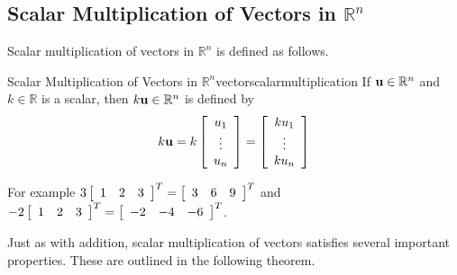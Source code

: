 \subsection{Scalar Multiplication of Vectors in \texorpdfstring{$\mathbb{R}^n$}{Rn}}

Scalar multiplication of vectors in $\mathbb{R}^n$ is defined as 
follows.

\begin{definition}{Scalar Multiplication of Vectors in $\mathbb{R}^n$}{vectorscalarmultiplication}
If ${\bf u}\in \mathbb{R}^{n}$ and $k\in \mathbb{R}$ is a
scalar, then $k{\bf u}\in \mathbb{R}^{n}$ is defined by
\begin{equation*}
k{\bf u}=k\left[ \begin{array}{c}
u_{1} \\
\vdots \\
u_{n}
\end{array}
\right] = \left[ \begin{array}{c}
ku_{1} \\
\vdots \\
ku_{n}
\end{array}
\right]
\end{equation*}
\end{definition}

For example 
$3 \left[
\begin{array}{rrr}
1 & 2 & 3
\end{array}
\right]^T =
\left[
\begin{array}{rrr}
3 & 6 & 9
\end{array}
\right]^T$
 and 
$-2\left[
\begin{array}{rrr}
1 & 2 & 3
\end{array}
\right]^T
=
\left[
\begin{array}{rrr}
-2 & -4 & -6
\end{array}
\right]^T$.

Just as with addition, scalar multiplication of vectors satisfies several important properties. These are 
outlined in the following theorem. 

